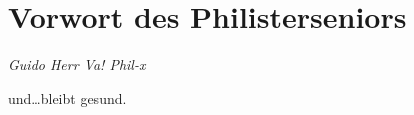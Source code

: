 \section{Vorwort des Philisterseniors}

\begin{multicols}{2}

	\begin{flushright}
		\hfill\emph{Guido Herr Va! Phil-x}
	\end{flushright}
	und…bleibt gesund.
\end{multicols}

\begin{figurehere}
	\begin{center}
		
	\end{center}
\end{figurehere}

